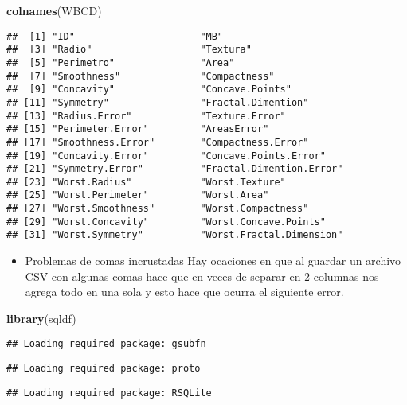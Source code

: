 \documentclass[]{article}
\newenvironment{Shaded}{\begin{snugshade}}{\end{snugshade}}
\newcommand{\KeywordTok}[1]{\textcolor[rgb]{0.13,0.29,0.53}{\textbf{#1}}}
\newcommand{\NormalTok}[1]{#1}
\providecommand{\tightlist}{%
  \setlength{\itemsep}{0pt}\setlength{\parskip}{0pt}}
\begin{document}
\begin{Shaded}
\begin{Highlighting}[]
\KeywordTok{colnames}\NormalTok{(WBCD)}
\end{Highlighting}
\end{Shaded}

\begin{verbatim}
##  [1] "ID"                      "MB"                     
##  [3] "Radio"                   "Textura"                
##  [5] "Perimetro"               "Area"                   
##  [7] "Smoothness"              "Compactness"            
##  [9] "Concavity"               "Concave.Points"         
## [11] "Symmetry"                "Fractal.Dimention"      
## [13] "Radius.Error"            "Texture.Error"          
## [15] "Perimeter.Error"         "AreasError"             
## [17] "Smoothness.Error"        "Compactness.Error"      
## [19] "Concavity.Error"         "Concave.Points.Error"   
## [21] "Symmetry.Error"          "Fractal.Dimention.Error"
## [23] "Worst.Radius"            "Worst.Texture"          
## [25] "Worst.Perimeter"         "Worst.Area"             
## [27] "Worst.Smoothness"        "Worst.Compactness"      
## [29] "Worst.Concavity"         "Worst.Concave.Points"   
## [31] "Worst.Symmetry"          "Worst.Fractal.Dimension"
\end{verbatim}

\begin{itemize}
\tightlist
\item
  Problemas de comas incrustadas Hay ocaciones en que al guardar un
  archivo CSV con algunas comas hace que en veces de separar en 2
  columnas nos agrega todo en una sola y esto hace que ocurra el
  siguiente error.
\end{itemize}

\begin{Shaded}
\begin{Highlighting}[]
\KeywordTok{library}\NormalTok{(sqldf)}
\end{Highlighting}
\end{Shaded}

\begin{verbatim}
## Loading required package: gsubfn
\end{verbatim}

\begin{verbatim}
## Loading required package: proto
\end{verbatim}

\begin{verbatim}
## Loading required package: RSQLite
\end{verbatim}
\end{document}
